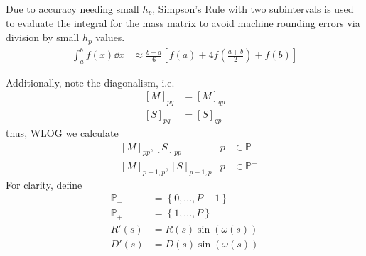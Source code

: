 \documentclass{report}
\newcommand\Par[1]{{ \left({#1}\right) }}
\newcommand\Brack[1]{{ \left[{#1}\right] }}
\newcommand\Brace[1]{{ \left\{{#1}\right\} }}
\newcommand\bbP{{ \mathbb{P} }}
\newcommand\D{{ D' }}
\newcommand\R{{ R' }}
\begin{document}
Due to accuracy needing small $h_p$, Simpson's Rule with two subintervals is used to evaluate the integral for the mass matrix to avoid machine rounding errors via division by small $h_p$ values.
\begin{align*}
	\int_a^b f(x) \dd{x} &\approx \frac{b - a}{6} \Brack{f(a) + 4 f\Par{\frac{a + b}{2}} + f(b)}
\end{align*}

Additionally, note the diagonalism, i.e.
\begin{align*}
	\Brack{M}_{pq} &= \Brack{M}_{qp} \\
	\Brack{S}_{pq} &= \Brack{S}_{qp}
\end{align*}
thus, WLOG we calculate
\begin{align*}
	& \Brack{M}_{pp}, \Brack{S}_{pp} & p &\in \bbP \tag{diagonal} \\
	& \Brack{M}_{p-1, p}, \Brack{S}_{p-1, p} & p &\in \bbP^+ \tag{off-diagonal}
\end{align*}
For clarity, define
\begin{align*}
	\bbP_- &= \Brace{0, ..., P-1} \\
	\bbP_+ &= \Brace{1, ..., P} \\
	\R(s) &= R(s) \sin\Par{\omega(s)} \\
	\D(s) &= D(s) \sin\Par{\omega(s)}
\end{align*}
\end{document}
